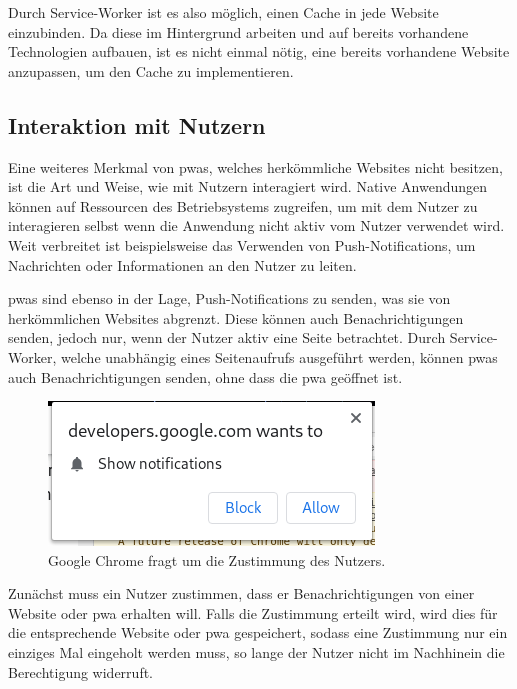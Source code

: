 \documentclass[12pt, parskip=half]{scrartcl}       %
\begin{document}

Durch Service-Worker ist es also möglich, einen Cache in jede Website einzubinden.
Da diese im Hintergrund arbeiten und auf bereits vorhandene Technologien aufbauen, ist es nicht einmal nötig, eine bereits vorhandene Website anzupassen, um den Cache zu implementieren.


\subsection{Interaktion mit Nutzern}

Eine weiteres Merkmal von \acp{pwa}, welches herkömmliche Websites nicht besitzen, ist die Art und Weise, wie mit Nutzern interagiert wird.
Native Anwendungen können auf Ressourcen des Betriebsystems zugreifen, um mit dem Nutzer zu interagieren selbst wenn die Anwendung nicht aktiv vom Nutzer verwendet wird.
Weit verbreitet ist beispielsweise das Verwenden von Push-Notifications\cite{businessofapps_pushnotificationstatistics}, um Nachrichten oder Informationen an den Nutzer zu leiten.

\acp{pwa} sind ebenso in der Lage, Push-Notifications zu senden, was sie von herkömmlichen Websites abgrenzt.
Diese können auch Benachrichtigungen senden, jedoch nur, wenn der Nutzer aktiv eine Seite betrachtet.
Durch Service-Worker, welche unabhängig eines Seitenaufrufs ausgeführt werden, können \acp{pwa} auch Benachrichtigungen senden, ohne dass die \ac{pwa} geöffnet ist\cite{ejaz_progressive_pushnotifications}.

\begin{figure}[h]
  \centering
  \includegraphics[width=0.4\linewidth]{src/permission-request-chrome.png}
  \caption{Google Chrome fragt um die Zustimmung des Nutzers.}
  \label{fig:chrome_permission}
\end{figure}

Zunächst muss ein Nutzer zustimmen, dass er Benachrichtigungen von einer Website oder \ac{pwa} erhalten will.
Falls die Zustimmung erteilt wird, wird dies für die entsprechende Website oder \ac{pwa} gespeichert, sodass eine Zustimmung nur ein einziges Mal eingeholt werden muss, so lange der Nutzer nicht im Nachhinein die Berechtigung widerruft.
\end{document}
